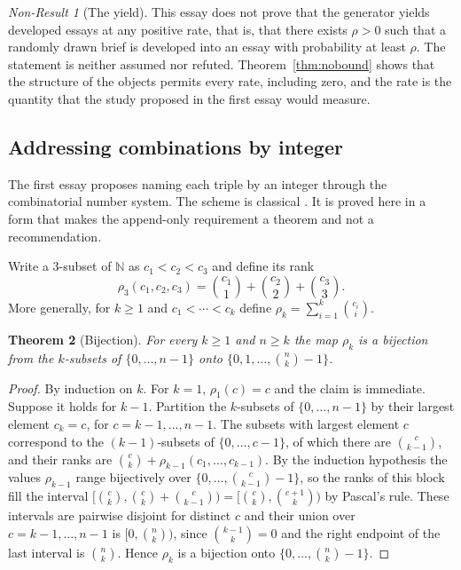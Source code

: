 \documentclass[11pt]{article}
\theoremstyle{plain}
\newtheorem{theorem}{Theorem}[section]
\theoremstyle{definition}
\theoremstyle{remark}
\newtheorem{nonresult}[theorem]{Non-Result}
\newcommand{\Nat}{\mathbb{N}}
\begin{document}
\begin{nonresult}[The yield]\label{nr:yield}
This essay does not prove that the generator yields developed essays at any positive rate, that is, that there exists $\rho>0$ such that a randomly drawn brief is developed into an essay with probability at least $\rho$. The statement is neither assumed nor refuted. Theorem~\ref{thm:nobound} shows that the structure of the objects permits every rate, including zero, and the rate is the quantity that the study proposed in the first essay would measure.
\end{nonresult}

\subsection{Addressing combinations by integer}

The first essay proposes naming each triple by an integer through the combinatorial number system. The scheme is classical \cite{knuth2011}. It is proved here in a form that makes the append-only requirement a theorem and not a recommendation.

Write a $3$-subset of $\Nat$ as $c_1<c_2<c_3$ and define its rank
\[
\rho_3(c_1,c_2,c_3)=\binom{c_1}{1}+\binom{c_2}{2}+\binom{c_3}{3}.
\]
More generally, for $k\ge1$ and $c_1<\cdots<c_k$ define $\rho_k=\sum_{i=1}^k\binom{c_i}{i}$.

\begin{theorem}[Bijection]\label{thm:rank}
For every $k\ge1$ and $n\ge k$ the map $\rho_k$ is a bijection from the $k$-subsets of $\{0,\ldots,n-1\}$ onto $\{0,1,\ldots,\binom{n}{k}-1\}$.
\end{theorem}

\begin{proof}
By induction on $k$. For $k=1$, $\rho_1(c)=c$ and the claim is immediate. Suppose it holds for $k-1$. Partition the $k$-subsets of $\{0,\ldots,n-1\}$ by their largest element $c_k=c$, for $c=k-1,\ldots,n-1$. The subsets with largest element $c$ correspond to the $(k-1)$-subsets of $\{0,\ldots,c-1\}$, of which there are $\binom{c}{k-1}$, and their ranks are $\binom{c}{k}+\rho_{k-1}(c_1,\ldots,c_{k-1})$. By the induction hypothesis the values $\rho_{k-1}$ range bijectively over $\{0,\ldots,\binom{c}{k-1}-1\}$, so the ranks of this block fill the interval $[\binom{c}{k},\binom{c}{k}+\binom{c}{k-1})=[\binom{c}{k},\binom{c+1}{k})$ by Pascal's rule. These intervals are pairwise disjoint for distinct $c$ and their union over $c=k-1,\ldots,n-1$ is $[0,\binom{n}{k})$, since $\binom{k-1}{k}=0$ and the right endpoint of the last interval is $\binom{n}{k}$. Hence $\rho_k$ is a bijection onto $\{0,\ldots,\binom{n}{k}-1\}$. \qedhere
\end{proof}
\end{document}
